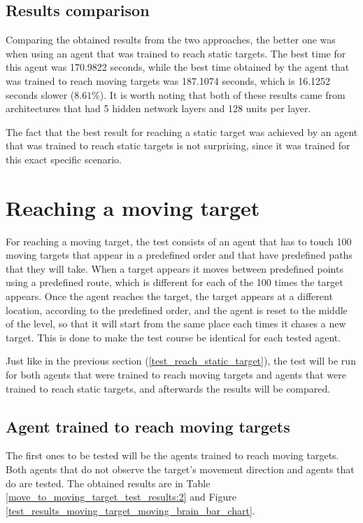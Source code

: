 \subsection{Results comparison}
Comparing the obtained results from the two approaches, the better one was when using an agent that was trained to reach static targets. The best time for this agent was 170.9822 seconds, while the best time obtained by the agent that was trained to reach moving targets was 187.1074 seconds, which is 16.1252 seconds slower ($8.61\%$). It is worth noting that both of these results came from architectures that had 5 hidden network layers and 128 units per layer.

The fact that the best result for reaching a static target was achieved by an agent that was trained to reach static targets is not surprising, since it was trained for this exact specific scenario.



\section{Reaching a moving target} \label{test_reach_moving_target}

For reaching a moving target, the test consists of an agent that has to touch 100 moving targets that appear in a predefined order and that have predefined paths that they will take. When a target appears it moves between predefined points using a predefined route, which is different for each of the 100 times the target appears. Once the agent reaches the target, the target appears at a different location, according to the predefined order, and the agent is reset to the middle of the level, so that it will start from the same place each times it chases a new target. This is done to make the test course be identical for each tested agent.

Just like in the previous section (\ref{test_reach_static_target}), the test will be run for both agents that were trained to reach moving targets and agents that were trained to reach static targets, and afterwards the results will be compared.


\subsection{Agent trained to reach moving targets}

The first ones to be tested will be the agents trained to reach moving targets. Both agents that do not observe the target's movement direction and agents that do are tested. The obtained results are in Table \ref{move_to_moving_target_test_results:2} and Figure \ref{test_results_moving_target_moving_brain_bar_chart}. 

